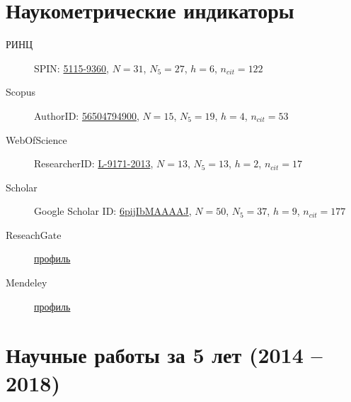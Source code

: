 \documentclass[a4paper,12pt]{article}
\begin{document}
	\sloppy
	\renewcommand{\refname}{}
	
	\section*{Наукометрические индикаторы}
	\begin{description}
		\item [РИНЦ] SPIN: \href{http://elibrary.ru/author_profile.asp?authorid=724544}{5115-9360}, $N=31$, $N_5=27$, $h=6$, $n_{cit}=122$
		
		\item [Scopus] AuthorID: \href{https://www.scopus.com/authid/detail.uri?authorId=56504794900}{56504794900}, $N=15$, $N_5=19$, $h=4$, $n_{cit}=53$
		
		\item[WebOfScience] ResearcherID: \href{http://www.researcherid.com/rid/L-9171-2013}{L-9171-2013}, $N=13$, $N_5=13$, $h=2$, $n_{cit}=17$
		
		\item[Scholar] Google Scholar ID: \href{https://scholar.google.ru/citations?user=6pijIbMAAAAJ&hl=ru}{6pijIbMAAAAJ}, $N=50$, $N_5=37$, $h=9$, $n_{cit}=177$
		
		\item[ReseachGate] \href{https://www.researchgate.net/profile/Aleksandr_Panov3}{профиль}
		
		\item[Mendeley] \href{https://www.mendeley.com/profiles/aleksandr-panov6/}{профиль}
		
	\end{description}

	\section*{Научные работы за 5 лет (2014 -- 2018)}
	\nocite{*}

	\begin{refsection}
		\nocite{*}
		\printbibliography[title={Статьи в рецензируемых журналах}, heading=subbibliography, keyword={mypub},check=recent]
		\printbibliography[title={Статьи на конференциях}, heading=subbibliography, keyword={myconf},check=recent]
		\printbibliography[title={Тезисы выступлений}, heading=subbibliography, keyword={myth},check=recent]
		\printbibliography[title={Переводные версии статей}, heading=subbibliography, keyword={mypubtr},check=recent, resetnumbers=true]
		\printbibliography[title={Книги и монографии}, heading=subbibliography, keyword={mybook},check=recent, resetnumbers=true]
	\end{refsection}
\end{document}

